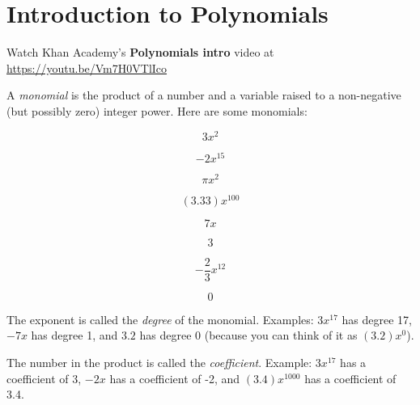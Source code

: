 \chapter{Introduction to Polynomials}

Watch Khan Academy's \textbf{Polynomials intro} video at \url{https://youtu.be/Vm7H0VTlIco}

A \emph{monomial} is the product of a number and a variable raised to a non-negative (but possibly zero) integer power. Here are some monomials:
\begin{multicols}{4}
  \begin{equation*}
    3 x^2
  \end{equation*}

  \begin{equation*}
    -2 x^{15}
  \end{equation*}

  \begin{equation*}
    \pi x^2
  \end{equation*}

  \begin{equation*}
    (3.33)x^{100}
  \end{equation*}

  \begin{equation*}
    7x
  \end{equation*}

  \begin{equation*}
    3
  \end{equation*}

  \begin{equation*}
    -\frac{2}{3}x^{12}
  \end{equation*}

  \begin{equation*}
    0
  \end{equation*}

  
\end{multicols}

The exponent is called the \emph{degree} of the monomial. Examples: $3x^{17}$
has degree 17, $-7x$ has degree 1, and $3.2$ has degree 0 (because you can think of it as $(3.2)x^0$).

The number in the product is called the \emph{coefficient}.  Example: $3x^{17}$ has a coefficient of 3, $-2x$ has a coefficient of -2, and $(3.4)x^{1000}$ has a coefficient of 3.4.

